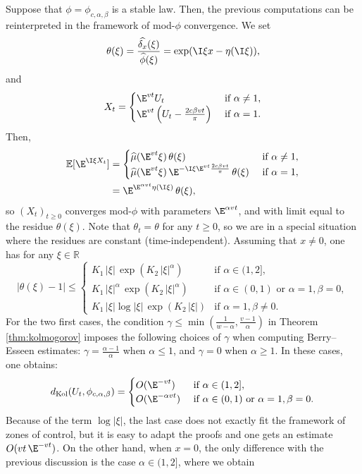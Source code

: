 \documentclass[envcountsame]{svmult}
\newcommand{\R}{\mathbb{R}}
\newcommand{\esper}{\mathbb{E}}
\newcommand{\dkol}{d_\mathrm{Kol}}
\begin{document}
Suppose that $\phi=\phi_{c,\alpha,\beta}$ is a stable law. Then, the previous computations can be reinterpreted in the framework of mod-$\phi$ convergence. We set 
$$\theta(\xi) =  \frac{\widehat{\delta_{x}}(\xi)}{\widehat{\phi}(\xi)} = \exp(\I \xi x - \eta(\I \xi)),$$
and 
$$X_t = \begin{cases}
     \E^{vt} U_t &\text{ if }\alpha \neq 1,\\
     \E^{vt} \left(U_t - \frac{2c\beta vt}{\pi}\right) &\text{ if }\alpha = 1.
\end{cases}$$ 
Then,
\begin{align*}
\esper[\E^{\I \xi X_t}] &= \begin{cases}
    \widehat{\mu}(\E^{vt} \xi) \,\theta(\xi)&\text{ if }\alpha \neq 1,\\
    \widehat{\mu}(\E^{vt} \xi)\,\E^{-\I \xi \E^{vt} \frac{2c\beta vt}{\pi}} \,\theta(\xi)&\text{ if }\alpha = 1,
\end{cases}\\
&= \E^{\E^{\alpha vt}\eta(\I \xi)} \,\theta(\xi),
\end{align*}
so $(X_t)_{t \geq 0}$ converges mod-$\phi$ with parameters $\E^{\alpha vt}$, and with limit equal to the residue $\theta(\xi)$. Note that $\theta_t = \theta$ for any $t \geq 0$, so we are in a special situation where the residues are constant (time-independent). Assuming that $x \neq 0$, one has for any $\xi \in \R$
$$|\theta(\xi)-1| \leq \begin{cases}
K_1\, |\xi|\,\exp(K_2\,|\xi|^\alpha) &\text{if }\alpha \in (1,2],\\
K_1\, |\xi|^{\alpha}\,\exp(K_2\,|\xi|^\alpha) & \text{if }\alpha \in (0,1) \text{ or }\alpha=1,\beta=0,\\
K_1\, |\xi|\log |\xi| \,\exp(K_2\,|\xi|) &\text{if }\alpha=1,\beta \neq 0.
\end{cases} $$
For the two first cases, the condition $\gamma \leq \min(\frac{1}{w-\alpha},\frac{v-1}{\alpha})$ in Theorem \ref{thm:kolmogorov} imposes the following choices of $\gamma$ when computing Berry--Esseen estimates: $\gamma = \frac{\alpha-1}{\alpha}$ when $\alpha\leq 1$, and $\gamma = 0$ when $\alpha \geq 1$. In these cases, one obtains:
$$\dkol(U_t, \phi_{c,\alpha,\beta}) = \begin{cases}
    O(\E^{-vt}) &\text{ if } \alpha \in (1,2],\\
    O(\E^{-\alpha vt}) &\text{ if }\alpha \in (0,1) \text{ or }\alpha=1,\beta=0.
\end{cases}$$
Because of the term $\log |\xi|$, the last case does not exactly fit the framework of zones of control, but it is easy to adapt the proofs and one gets an estimate $O(vt\,\E^{-vt})$. On the other hand, when $x=0$, the only difference with the previous discussion is the case $\alpha \in (1,2]$, where we obtain
\end{document}
